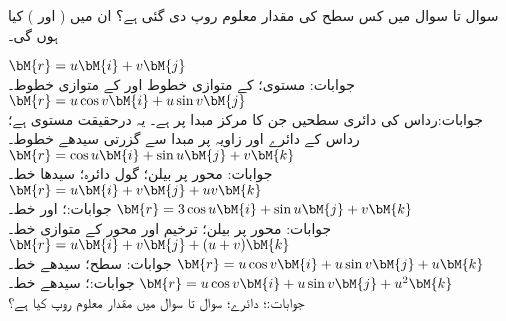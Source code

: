 سوال  تا سوال  میں کس سطح کی مقدار معلوم روپ دی گئی ہے؟ ان میں  ( اور ) کیا ہوں گی۔  

\quad
$\bM{r}=u\bM{i}+v\bM{j}$\\
جوابات:\quad {} مستوی؛  کے متوازی خطوط اور  کے متوازی خطوط۔
\quad
$\bM{r}=u\cos v\bM{i}+u\sin v\bM{j}$\\
جوابات:\quad رداس  کی دائری سطحیں جن کا مرکز مبدا پر ہے۔ یہ درحقیقت  مستوی ہے؛ رداس  کے دائرے اور زاویہ  پر مبدا سے گزرتی سیدھے خطوط۔
\quad
$\bM{r}=\cos u\bM{i}+\sin u\bM{j}+v\bM{k}$\\
جوابات:\quad {} محور پر  بیلن؛ گول دائرہ؛ سیدھا خط۔
\quad
$\bM{r}=u\bM{i}+v\bM{j}+uv\bM{k}$\\
جوابات:\quad {}؛  اور  خط۔
\quad
$\bM{r}=3\cos u\bM{i}+\sin u \bM{j}+v\bM{k}$\\
جوابات:\quad {} محور پر  بیلن؛ ترخیم اور  محور کے متوازی خط۔
\quad
$\bM{r}=u\bM{i}+v \bM{j}+(u+v)\bM{k}$\\
جوابات:\quad {} سطح؛ سیدھے خط۔
\quad
$\bM{r}=u\cos v\bM{i}+u\sin v \bM{j}+u\bM{k}$\\
جوابات:\quad  {}؛ سیدھے خط۔
\quad
$\bM{r}=u\cos v\bM{i}+u\sin v \bM{j}+u^2\bM{k}$\\
جوابات:\quad {}؛ دائرے؛ 
سوال  تا سوال  میں مقدار معلوم روپ کیا ہے؟

